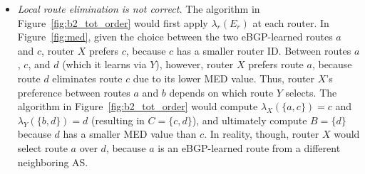 
\begin{itemize}
\item {\em Local route elimination is not correct.}  The algorithm in
Figure~\ref{fig:b2_tot_order} would first apply $\lambda_r(E_r)$ at each
router.  In Figure~\ref{fig:med}, given the choice between the two
eBGP-learned routes $a$ and $c$, router $X$ prefers $c$, because $c$ has
a smaller router ID.  Between routes $a$, $c$, and $d$ (which it learns
via $Y$), however, router $X$ prefers route $a$, because route $d$
eliminates route $c$ due to its lower MED value.  Thus, router $X$'s
preference between routes $a$ and $b$ depends on which route $Y$
selects.  The algorithm in Figure~\ref{fig:b2_tot_order} would compute
$\lambda_X(\{a,c\})=c$ and $\lambda_Y(\{b,d\})=d$ (resulting in
$C=\{c,d\}$), and ultimately compute $B=\{d\}$ because $d$ has a smaller
MED value than $c$.  In reality, though, router $X$ would select route
$a$ over $d$, because $a$ is an eBGP-learned route from a different
neighboring AS.

%
%


\end{itemize}
